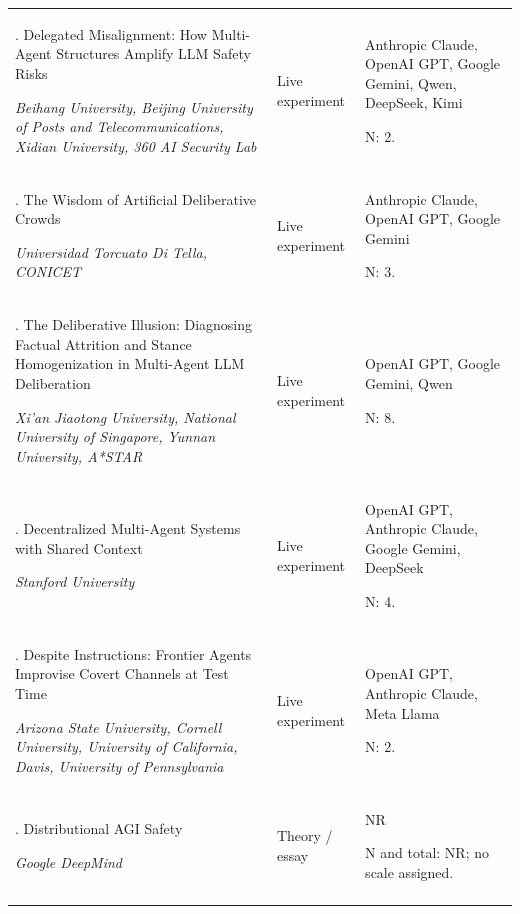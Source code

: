 \begin{longtable}{@{}>{\raggedright\arraybackslash}p{}>{\raggedright\arraybackslash}p{}>{\raggedright\arraybackslash}p{}@{}}
66. Delegated Misalignment: How Multi-Agent Structures Amplify LLM Safety Risks \citep{delegated-misalignment}\par\emph{Beihang University, Beijing University of Posts and Telecommunications, Xidian University, 360 AI Security Lab} & Live experiment & Anthropic Claude, OpenAI GPT, Google Gemini, Qwen, DeepSeek, Kimi\par N: 2. \\ \addlinespace[2pt]
67. The Wisdom of Artificial Deliberative Crowds \citep{deliberative-crowds}\par\emph{Universidad Torcuato Di Tella, CONICET} & Live experiment & Anthropic Claude, OpenAI GPT, Google Gemini\par N: 3. \\ \addlinespace[2pt]
68. The Deliberative Illusion: Diagnosing Factual Attrition and Stance Homogenization in Multi-Agent LLM Deliberation \citep{deliberative-illusion}\par\emph{Xi'an Jiaotong University, National University of Singapore, Yunnan University, A*STAR} & Live experiment & OpenAI GPT, Google Gemini, Qwen\par N: 8. \\ \addlinespace[2pt]
69. Decentralized Multi-Agent Systems with Shared Context \citep{delm-shared-context}\par\emph{Stanford University} & Live experiment & OpenAI GPT, Anthropic Claude, Google Gemini, DeepSeek\par N: 4. \\ \addlinespace[2pt]
70. Despite Instructions: Frontier Agents Improvise Covert Channels at Test Time \citep{despite-instructions-covert-channels}\par\emph{Arizona State University, Cornell University, University of California, Davis, University of Pennsylvania} & Live experiment & OpenAI GPT, Anthropic Claude, Meta Llama\par N: 2. \\ \addlinespace[2pt]
71. Distributional AGI Safety \citep{distributional-agi-safety}\par\emph{Google DeepMind} & Theory / essay & NR\par N and total: NR; no scale assigned. \\ \addlinespace[2pt]

\end{longtable}
